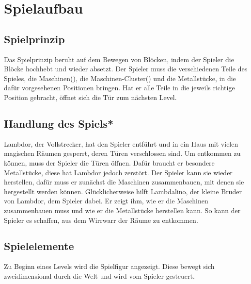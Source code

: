 \documentclass{scrartcl}
\begin{document}

\section{Spielaufbau}

\subsection{Spielprinzip}
Das Spielprinzip beruht auf dem Bewegen von Blöcken, indem der Spieler die Blöcke hochhebt und wieder absetzt. Der Spieler muss die verschiedenen Teile des Spieles, die Maschinen(), die Maschinen-Cluster() und die Metallstücke, in die dafür vorgesehenen Positionen bringen. Hat er alle Teile in die jeweils richtige Position gebracht, öffnet sich die Tür zum nächsten Level.

\subsection{Handlung des Spiels*} \label{subsection:Story}
Lambdor, der Vollstrecker, hat den Spieler entführt und in ein Haus mit vielen magischen Räumen gesperrt, deren Türen verschlossen sind. Um entkommen zu können, muss der Spieler die Türen öffnen. Dafür braucht er besondere Metallstücke, diese hat Lambdor jedoch zerstört. Der Spieler kann sie wieder herstellen, dafür muss er zunächst die Maschinen zusammenbauen, mit denen sie hergestellt werden können. Glücklicherweise hilft Lambdalino, der kleine Bruder von Lambdor, dem Spieler dabei. Er zeigt ihm, wie er die Maschinen zusammenbauen muss und wie er die Metallstücke herstellen kann. So kann der Spieler es schaffen, aus dem Wirrwarr der Räume zu entkommen.


\subsection{Spielelemente}

Zu Beginn eines Levels wird die Spielfigur angezeigt. Diese bewegt sich zweidimensional durch die Welt und wird vom Spieler gesteuert.
\end{document}
